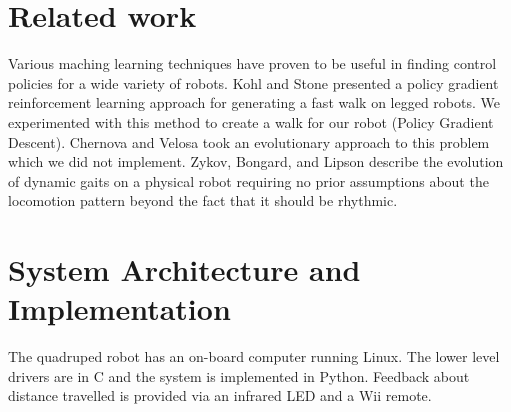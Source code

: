 \section{Related work}

Various maching learning techniques have proven to be useful in finding
control policies for a wide variety of robots. Kohl and Stone\cite{1}
presented a policy gradient reinforcement learning approach for generating
a fast walk on legged robots. We experimented with this method to create
a walk for our robot (Policy Gradient Descent). Chernova and Velosa\cite{3}
took an evolutionary approach to this problem which we did not implement.
Zykov, Bongard, and Lipson\cite{4} describe the evolution of dynamic gaits 
on a physical robot requiring no prior
assumptions about the locomotion pattern beyond the fact that it should be
rhythmic. 


\section{System Architecture and Implementation}

The quadruped robot has an on-board computer running Linux. The lower
level drivers are in C and the system is implemented in Python. Feedback about distance travelled is provided via an infrared LED and a Wii remote. 

